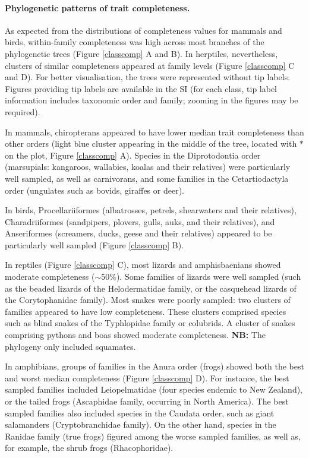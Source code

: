 \paragraph{Phylogenetic patterns of trait completeness.}
As expected from the distributions of completeness values for mammals and birds, within-family completeness was high across most branches of the phylogenetic trees (Figure \ref{classcomp} A and B). In herptiles, nevertheless, clusters of similar completeness appeared at family levels (Figure \ref{classcomp} C and D).
For better visualisation, the trees were represented without tip labels. Figures providing tip labels are available in the SI (for each class, tip label information includes taxonomic order and family; zooming in the figures may be required). 

In mammals, chiropterans appeared to have lower median trait completeness than other orders (light blue cluster appearing in the middle of the tree, located with $*$ on the plot, Figure \ref{classcomp} A). Species in the Diprotodontia order (marsupials: kangaroos, wallabies, koalas and their relatives) were particularly well sampled, as well as carnivorans, and some families in the Cetartiodactyla order (ungulates such as bovids, giraffes or deer).

In birds, Procellariiformes (albatrosses, petrels, shearwaters and their relatives), Charadriiformes (sandpipers, plovers, gulls, auks, and their relatives), and Anseriformes (screamers, ducks, geese and their relatives) appeared to be particularly well sampled (Figure \ref{classcomp} B). 

In reptiles (Figure \ref{classcomp} C), most lizards and amphisbaenians  
showed moderate completeness ($\sim$50\%). Some families of lizards were well sampled (such as the beaded lizards of the Helodermatidae family, or the casquehead lizards of the Corytophanidae family). Most snakes were poorly sampled: two clusters of families appeared to have low completeness. These clusters comprised species such as blind snakes of the Typhlopidae family or colubrids. A cluster of snakes comprising pythons and boas showed moderate completeness. \textbf{NB:} The phylogeny only included squamates.

In amphibians, groups of families in the Anura order (frogs) showed both the best and worst median completeness (Figure \ref{classcomp} D). For instance, the best sampled families included Leiopelmatidae (four species endemic to New Zealand), or the tailed frogs (Ascaphidae family, occurring in North America). The best sampled families also included species in the Caudata order, such as giant salamanders (Cryptobranchidae family). On the other hand, species in the Ranidae family (true frogs) figured among the worse sampled families, as well as, for example, the shrub frogs (Rhacophoridae). 

